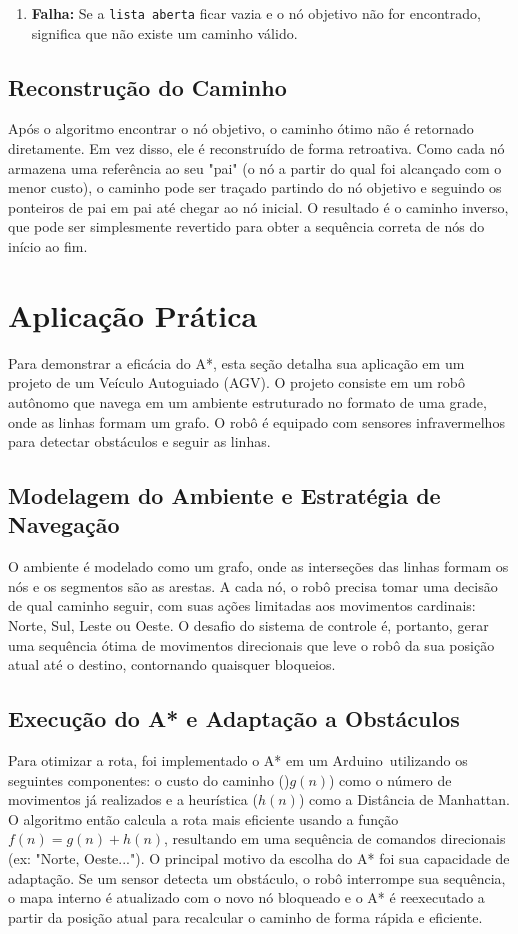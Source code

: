 \documentclass[conference]{IEEEtran}
\begin{document}
\begin{enumerate}
    \item \textbf{Falha:} Se a \texttt{lista aberta} ficar vazia e o nó objetivo não for encontrado, significa que não existe um caminho válido.
\end{enumerate}

\subsection{Reconstrução do Caminho}
Após o algoritmo encontrar o nó objetivo, o caminho ótimo não é retornado diretamente. Em vez disso, ele é reconstruído de forma retroativa. Como cada nó armazena uma referência ao seu "pai" (o nó a partir do qual foi alcançado com o menor custo), o caminho pode ser traçado partindo do nó objetivo e seguindo os ponteiros de pai em pai até chegar ao nó inicial. O resultado é o caminho inverso, que pode ser simplesmente revertido para obter a sequência correta de nós do início ao fim.

\section{Aplicação Prática}
Para demonstrar a eficácia do A*, esta seção detalha sua aplicação em um projeto de um Veículo Autoguiado (AGV). O projeto consiste em um robô autônomo que navega em um ambiente estruturado no formato de uma grade, onde as linhas formam um grafo. O robô é equipado com sensores infravermelhos para detectar obstáculos e seguir as linhas.

\subsection{Modelagem do Ambiente e Estratégia de Navegação}
O ambiente é modelado como um grafo, onde as interseções das linhas formam os nós e os segmentos são as arestas. A cada nó, o robô precisa tomar uma decisão de qual caminho seguir, com suas ações limitadas aos movimentos cardinais: Norte, Sul, Leste ou Oeste. O desafio do sistema de controle é, portanto, gerar uma sequência ótima de movimentos direcionais que leve o robô da sua posição atual até o destino, contornando quaisquer bloqueios.

\subsection{Execução do A* e Adaptação a Obstáculos}
Para otimizar a rota, foi implementado o A* em um Arduino\textregistered\, utilizando os seguintes componentes: o custo do caminho ()$g(n)$) como o número de movimentos já realizados e a heurística ($h(n)$) como a Distância de Manhattan. O algoritmo então calcula a rota mais eficiente usando a função $f(n) = g(n) + h(n)$, resultando em uma sequência de comandos direcionais (ex: "Norte, Oeste..."). O principal motivo da escolha do A* foi sua capacidade de adaptação. Se um sensor detecta um obstáculo, o robô interrompe sua sequência, o mapa interno é atualizado com o novo nó bloqueado e o A* é reexecutado a partir da posição atual para recalcular o caminho de forma rápida e eficiente.
\end{document}
